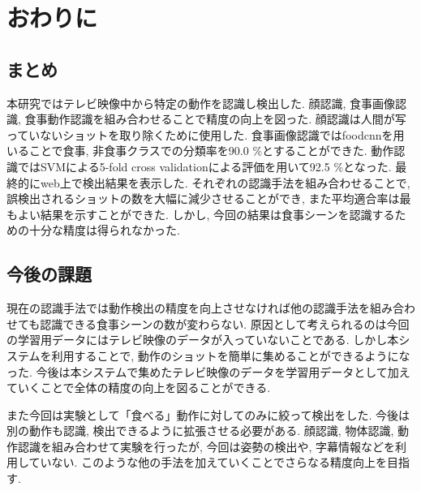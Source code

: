 \chapter{おわりに}
\section{まとめ}
本研究ではテレビ映像中から特定の動作を認識し検出した. 顔認識, 食事画像認識, 食事動作認識を組み合わせることで精度の向上を図った. 
顔認識は人間が写っていないショットを取り除くために使用した. 
食事画像認識ではfoodcnnを用いることで食事, 非食事クラスでの分類率を90.0 \%とすることができた. 
動作認識ではSVMによる5-fold cross validationによる評価を用いて92.5 \%となった. 
最終的にweb上で検出結果を表示した. それぞれの認識手法を組み合わせることで, 誤検出されるショットの数を大幅に減少させることができ, また平均適合率は最もよい結果を示すことができた. 
しかし, 今回の結果は食事シーンを認識するための十分な精度は得られなかった. 


\section{今後の課題}
現在の認識手法では動作検出の精度を向上させなければ他の認識手法を組み合わせても認識できる食事シーンの数が変わらない. 原因として考えられるのは今回の学習用データにはテレビ映像のデータが入っていないことである. 
しかし本システムを利用することで, 動作のショットを簡単に集めることができるようになった. 今後は本システムで集めたテレビ映像のデータを学習用データとして加えていくことで全体の精度の向上を図ることができる. \par
また今回は実験として「食べる」動作に対してのみに絞って検出をした. 今後は別の動作も認識, 検出できるように拡張させる必要がある. 
顔認識, 物体認識, 動作認識を組み合わせて実験を行ったが, 今回は姿勢の検出や, 字幕情報などを利用していない. 
このような他の手法を加えていくことでさらなる精度向上を目指す. 


\newpage